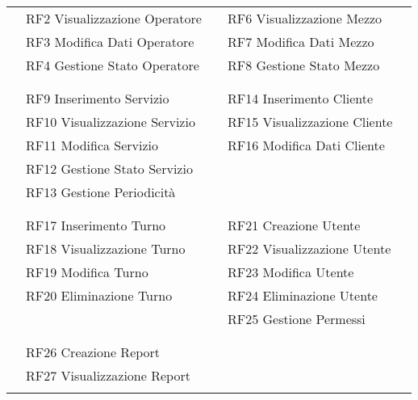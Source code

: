 \documentclass[green, fancy, 11pt]{elegantbook}
\begin{document}
\begin{center}
\begin{tabular}{|p{0.2cm} p{2.5cm} p{2cm} p{0.2cm} p{2.5cm} p{1cm} p{0.2cm}|}
	&\multicolumn{2}{|l|}{RF2 Visualizzazione Operatore}&&\multicolumn{2}{|l|}{RF6 Visualizzazione Mezzo}&\\
	&\multicolumn{2}{|l|}{RF3 Modifica Dati Operatore}&&\multicolumn{2}{|l|}{RF7  Modifica Dati Mezzo}&\\
	&\multicolumn{2}{|l|}{RF4 Gestione Stato Operatore}&&\multicolumn{2}{|l|}{RF8  Gestione Stato Mezzo}&\\
	\cline{5-6}
	\cline{2-3}
	&&&&&&\\
	\cline{2-3} \cline{5-6}
	&\multicolumn{2}{|l|}{\cellcolor{RussianGreen}{\textcolor{white}{GESTIONE SERVIZI}}}&&\multicolumn{2}{|l|}{\cellcolor{RussianGreen}{\textcolor{white}{GESTIONE CLIENTI}}}&\\
	\cline{2-3} \cline{5-6}
	&\multicolumn{2}{|l|}{RF9 Inserimento Servizio}&&\multicolumn{2}{|l|}{RF14 Inserimento Cliente}&\\
	&\multicolumn{2}{|l|}{RF10 Visualizzazione Servizio}&&\multicolumn{2}{|l|}{RF15 Visualizzazione Cliente}&\\
	&\multicolumn{2}{|l|}{RF11 Modifica Servizio}&&\multicolumn{2}{|l|}{RF16 Modifica Dati Cliente}&\\
	\cline{5-6}
	&\multicolumn{2}{|l|}{RF12 Gestione Stato Servizio}&&&&\\
	&\multicolumn{2}{|l|}{RF13 Gestione Periodicità}&&&&\\
	\cline{2-3}
	&&&&&&\\
	\cline{2-3} \cline{5-6}
	&\multicolumn{2}{|l|}{\cellcolor{RussianGreen}{\textcolor{white}{GESTIONE TURNI}}}&&\multicolumn{2}{|l|}{\cellcolor{RussianGreen}{\textcolor{white}{GESTIONE UTENTI}}}&\\
	\cline{2-3} \cline{5-6}
	&\multicolumn{2}{|l|}{RF17 Inserimento Turno}&&\multicolumn{2}{|l|}{RF21 Creazione Utente}&\\
	&\multicolumn{2}{|l|}{RF18 Visualizzazione Turno}&&\multicolumn{2}{|l|}{RF22 Visualizzazione Utente}&\\
	&\multicolumn{2}{|l|}{RF19 Modifica Turno}&&\multicolumn{2}{|l|}{RF23 Modifica Utente}&\\
	&\multicolumn{2}{|l|}{RF20 Eliminazione Turno}&&\multicolumn{2}{|l|}{RF24 Eliminazione Utente}&\\
	\cline{2-3}
	&&&&\multicolumn{2}{|l|}{RF25 Gestione Permessi}&\\ 
	\cline{5-6}
	&&&&&&\\
	\cline{2-3}
	&\multicolumn{2}{|l|}{\cellcolor{RussianGreen}{\textcolor{white}{GESTIONE REPORT}}}&&&&\\
	\cline{2-3}
	&\multicolumn{2}{|l|}{RF26 Creazione Report}&&&&\\
	&\multicolumn{2}{|l|}{RF27 Visualizzazione Report}&&&&\\
	\cline{2-3}
	&&&&&&\\
	\hline
\end{tabular}


\end{center}
\end{document}

